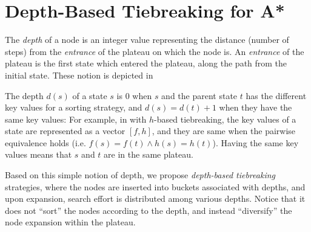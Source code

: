 \section{Depth-Based Tiebreaking for A*}

\label{sec:depth}

The \emph{depth} of a node is an integer value representing the distance
(number of steps) from the \emph{entrance} of the plateau on which the node is.
An \emph{entrance} of the plateau is the first state which entered the
plateau, along the path from the initial state. These notion is depicted
in 

\begin{figure}[htbp]
 
\end{figure}

The depth $d(s)$ of a
state $s$ is 0 when $s$ and the parent state $t$ has the different key
values for a sorting strategy, and $d(s)=d(t)+1$ when they have the same
key values: For example, in \astar with $h$-based tiebreaking, the key
values of a state are represented as a vector $[f,h]$, and they are same
when the pairwise equivalence holds (i.e. $f(s) = f(t) \land h(s) =
h(t)$).  Having the same key values means that $s$ and $t$ are in the
same plateau. 



Based on this simple notion of depth, we propose \emph{depth-based
tiebreaking} strategies, where the nodes are inserted into buckets
associated with depths, and upon expansion, search effort is distributed
among various depths. Notice that it does not ``sort'' the nodes
according to the depth, and instead ``diversify'' the node expansion
within the plateau.

